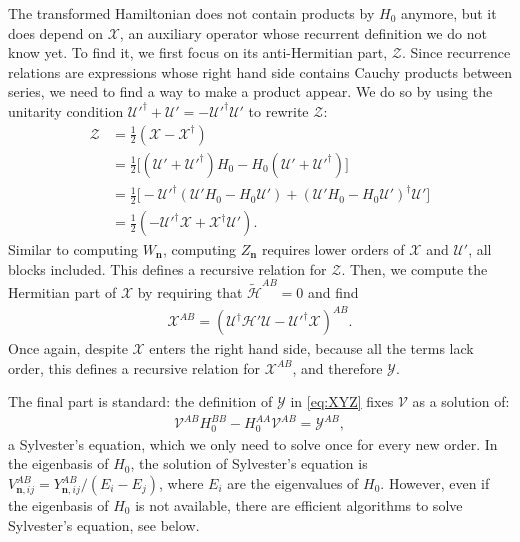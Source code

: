 The transformed Hamiltonian does not contain products by $H_0$ anymore, but it
does depend on $\mathcal{X}$, an auxiliary operator whose recurrent definition
we do not know yet.
To find it, we first focus on its anti-Hermitian part, $\mathcal{Z}$.
Since recurrence relations are expressions whose right hand side contains
Cauchy products between series, we need to find a way to make a product appear.
We do so by using the unitarity condition $\mathcal{U}'^\dagger + \mathcal{U}' =
-\mathcal{U}'^\dagger \mathcal{U}'$ to rewrite $\mathcal{Z}$:
%
\begin{align}
\label{eq:Z}
\mathcal{Z}
&= \frac{1}{2} (\mathcal{X} - \mathcal{X}^{\dagger}) \nonumber \\
&= \frac{1}{2}\Big[ (\mathcal{U}' + \mathcal{U}'^{\dagger}) H_0 - H_0 (\mathcal{U}' + \mathcal{U}'^{\dagger}) \Big] \nonumber \\
&= \frac{1}{2} \Big[ - \mathcal{U}'^{\dagger} (\mathcal{U}'H_0 - H_0 \mathcal{U}') + (\mathcal{U}'H_0 - H_0 \mathcal{U}')^{\dagger} \mathcal{U}' \Big] \nonumber \\
&= \frac{1}{2} (-\mathcal{U}'^{\dagger} \mathcal{X} + \mathcal{X}^{\dagger} \mathcal{U}').
\end{align}
%
Similar to computing $W_{\mathbf{n}}$, computing $Z_{\mathbf{n}}$ requires lower orders of
$\mathcal{X}$ and $\mathcal{U}'$, all blocks included.
This defines a recursive relation for $\mathcal{Z}$.
Then, we compute the Hermitian part of $\mathcal{X}$ by requiring that
$\tilde{\mathcal{H}}^{AB} = 0$ and find
%
\begin{align}
\label{eq:Y}
\mathcal{X}^{AB} = (\mathcal{U}^\dagger \mathcal{H}' \mathcal{U} -
\mathcal{U}'^\dagger \mathcal{X})^{AB}.
\end{align}
%
Once again, despite $\mathcal{X}$ enters the right hand side, because all the
terms lack  order, this defines a recursive relation for $\mathcal{X}^{AB}$,
and therefore $\mathcal{Y}$.

The final part is standard: the definition of $\mathcal{Y}$ in \eqref{eq:XYZ} fixes
$\mathcal{V}$ as a solution of:
%
\begin{align}
\label{eq:sylvester}
\mathcal{V}^{AB}H_0^{BB} - H_0^{AA} \mathcal{V}^{AB} = \mathcal{Y}^{AB},
\end{align}
%
a Sylvester's equation, which we only need to solve once for every new order.
In the eigenbasis of $H_0$, the solution of Sylvester's equation is
$V^{AB}_{\mathbf{n}, ij} = Y^{AB}_{\mathbf{n}, ij}/(E_i - E_j)$, where $E_i$ are the eigenvalues of
$H_0$.
However, even if the eigenbasis of $H_0$ is not available, there are efficient
algorithms to solve Sylvester's equation, see below.

